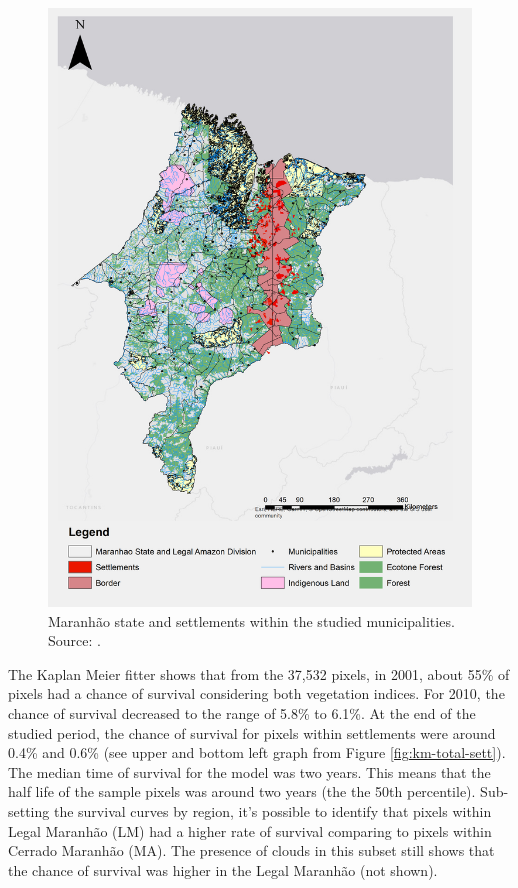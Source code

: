 \begin{figure}[H]
  \centering
  \includegraphics[width=1\textwidth, inner]{Chapter3/MaranhaoChapter3_Fig2.png}
\caption[Maranhão  state and settlements]{Maranhão  state and settlements within the studied municipalities. Source: \citep{MMMAwebsite,nugeo_2018}.}
\label{fig:delimitacaosett}
\end{figure}

The Kaplan Meier fitter shows that from the 37,532 pixels, in 2001, about 55\% of pixels had a chance of survival considering both vegetation indices. For 2010, the chance of survival decreased to the range of 5.8\% to 6.1\%. At the end of the studied period, the chance of survival for pixels within settlements were around 0.4\% and 0.6\% (see upper and bottom left graph from Figure \ref{fig:km-total-sett}). The median time of survival for the model was two years. This means that the half life of the sample pixels was around two years (the the 50th percentile). Sub-setting the survival curves by region, it's possible to identify that pixels within Legal Maranhão (LM) had a higher rate of survival comparing to pixels within Cerrado Maranhão (MA). The presence of clouds in this subset still shows that the chance of survival was higher in the Legal Maranhão (not shown). 

